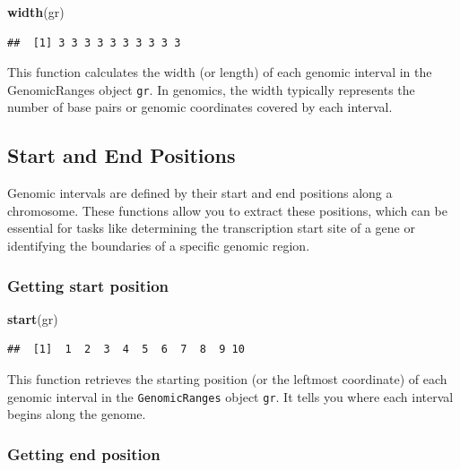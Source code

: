 \documentclass[
]{book}
\newenvironment{Shaded}{\begin{snugshade}}{\end{snugshade}}
\newcommand{\FunctionTok}[1]{\textcolor[rgb]{0.13,0.29,0.53}{\textbf{#1}}}
\newcommand{\NormalTok}[1]{#1}
\begin{document}
\begin{Shaded}
\begin{Highlighting}[]
\FunctionTok{width}\NormalTok{(gr)}
\end{Highlighting}
\end{Shaded}

\begin{verbatim}
##  [1] 3 3 3 3 3 3 3 3 3 3
\end{verbatim}

This function calculates the width (or length) of each genomic interval in the GenomicRanges object \texttt{gr}. In genomics, the width typically represents the number of base pairs or genomic coordinates covered by each interval.

\hypertarget{start-and-end-positions}{%
\subsection{Start and End Positions}\label{start-and-end-positions}}

Genomic intervals are defined by their start and end positions along a chromosome. These functions allow you to extract these positions, which can be essential for tasks like determining the transcription start site of a gene or identifying the boundaries of a specific genomic region.

\hypertarget{getting-start-position}{%
\subsubsection{Getting start position}\label{getting-start-position}}

\begin{Shaded}
\begin{Highlighting}[]
\FunctionTok{start}\NormalTok{(gr)}
\end{Highlighting}
\end{Shaded}

\begin{verbatim}
##  [1]  1  2  3  4  5  6  7  8  9 10
\end{verbatim}

This function retrieves the starting position (or the leftmost coordinate) of each genomic interval in the \texttt{GenomicRanges} object \texttt{gr}. It tells you where each interval begins along the genome.

\hypertarget{getting-end-position}{%
\subsubsection{Getting end position}\label{getting-end-position}}
\end{document}
